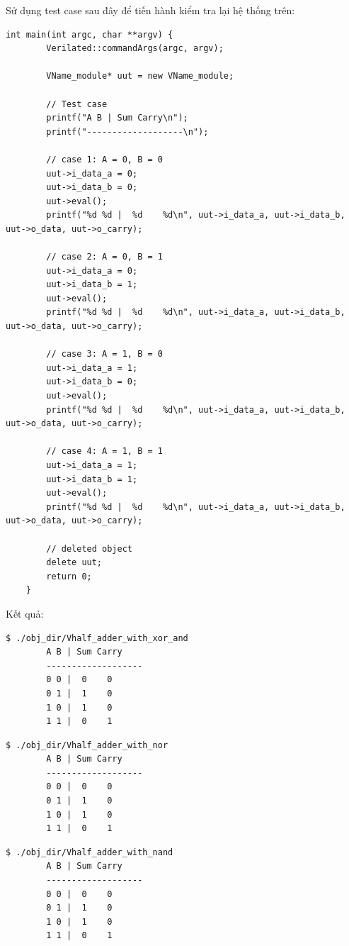 Sử dụng test case sau đây để tiến hành kiểm tra lại hệ thống trên:
\begin{lstlisting}[style = C, caption={Test bench của bộ Half Adder}]
	int main(int argc, char **argv) {
		Verilated::commandArgs(argc, argv);
		
		VName_module* uut = new VName_module;
		
		// Test case
		printf("A B | Sum Carry\n");
		printf("-------------------\n");
		
		// case 1: A = 0, B = 0
		uut->i_data_a = 0; 
		uut->i_data_b = 0;
		uut->eval();
		printf("%d %d |  %d    %d\n", uut->i_data_a, uut->i_data_b, uut->o_data, uut->o_carry);
		
		// case 2: A = 0, B = 1
		uut->i_data_a = 0; 
		uut->i_data_b = 1;
		uut->eval();
		printf("%d %d |  %d    %d\n", uut->i_data_a, uut->i_data_b, uut->o_data, uut->o_carry);
		
		// case 3: A = 1, B = 0
		uut->i_data_a = 1; 
		uut->i_data_b = 0;
		uut->eval();
		printf("%d %d |  %d    %d\n", uut->i_data_a, uut->i_data_b, uut->o_data, uut->o_carry);
		
		// case 4: A = 1, B = 1
		uut->i_data_a = 1; 
		uut->i_data_b = 1;
		uut->eval();
		printf("%d %d |  %d    %d\n", uut->i_data_a, uut->i_data_b, uut->o_data, uut->o_carry);
		
		// deleted object
		delete uut;
		return 0;
	}
\end{lstlisting}

Kết quả:


	\begin{lstlisting}[style = C, caption={Sử dụng cổng XOR và cổng AND}]
		$ ./obj_dir/Vhalf_adder_with_xor_and 
		A B | Sum Carry
		-------------------
		0 0 |  0    0
		0 1 |  1    0
		1 0 |  1    0
		1 1 |  0    1
	\end{lstlisting}
	
	\begin{lstlisting}[style=C, caption={Sử dụng cổng NOR}]
		$ ./obj_dir/Vhalf_adder_with_nor 
		A B | Sum Carry
		-------------------
		0 0 |  0    0
		0 1 |  1    0
		1 0 |  1    0
		1 1 |  0    1
	\end{lstlisting}
	
	\begin{lstlisting}[style = C, caption={Sử dụng cổng NAND}]
		$ ./obj_dir/Vhalf_adder_with_nand
		A B | Sum Carry
		-------------------
		0 0 |  0    0
		0 1 |  1    0
		1 0 |  1    0
		1 1 |  0    1
	\end{lstlisting}